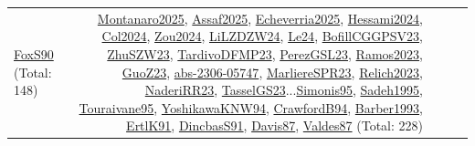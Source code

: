 {\begin{longtable}{p{3cm}r>{\raggedright\arraybackslash}p{6cm}>{\raggedright\arraybackslash}p{6cm}>{\raggedright\arraybackslash}p{8cm}}
\hyperref[detail:FoxS90]{FoxS90} (Total: 148) & \hyperref[detail:Montanaro2025]{Montanaro2025}, \hyperref[detail:Assaf2025]{Assaf2025}, \hyperref[detail:Echeverria2025]{Echeverria2025}, \hyperref[detail:Hessami2024]{Hessami2024}, \hyperref[detail:Col2024]{Col2024}, \hyperref[detail:Zou2024]{Zou2024}, \hyperref[detail:LiLZDZW24]{LiLZDZW24}, \hyperref[detail:Le24]{Le24}, \hyperref[detail:BofillCGGPSV23]{BofillCGGPSV23}, \hyperref[detail:ZhuSZW23]{ZhuSZW23}, \hyperref[detail:TardivoDFMP23]{TardivoDFMP23}, \hyperref[detail:PerezGSL23]{PerezGSL23}, \hyperref[detail:Ramos2023]{Ramos2023}, \hyperref[detail:GuoZ23]{GuoZ23}, \hyperref[detail:abs-2306-05747]{abs-2306-05747}, \hyperref[detail:MarliereSPR23]{MarliereSPR23}, \hyperref[detail:Relich2023]{Relich2023}, \hyperref[detail:NaderiRR23]{NaderiRR23}, \hyperref[detail:TasselGS23]{TasselGS23}...\hyperref[detail:Simonis95]{Simonis95}, \hyperref[detail:Sadeh1995]{Sadeh1995}, \hyperref[detail:Touraivane95]{Touraivane95}, \hyperref[detail:YoshikawaKNW94]{YoshikawaKNW94}, \hyperref[detail:CrawfordB94]{CrawfordB94}, \hyperref[detail:Barber1993]{Barber1993}, \hyperref[detail:ErtlK91]{ErtlK91}, \hyperref[detail:DincbasS91]{DincbasS91}, \hyperref[detail:Davis87]{Davis87}, \hyperref[detail:Valdes87]{Valdes87} (Total: 228)\\
\end{longtable}
}

\clearpage
